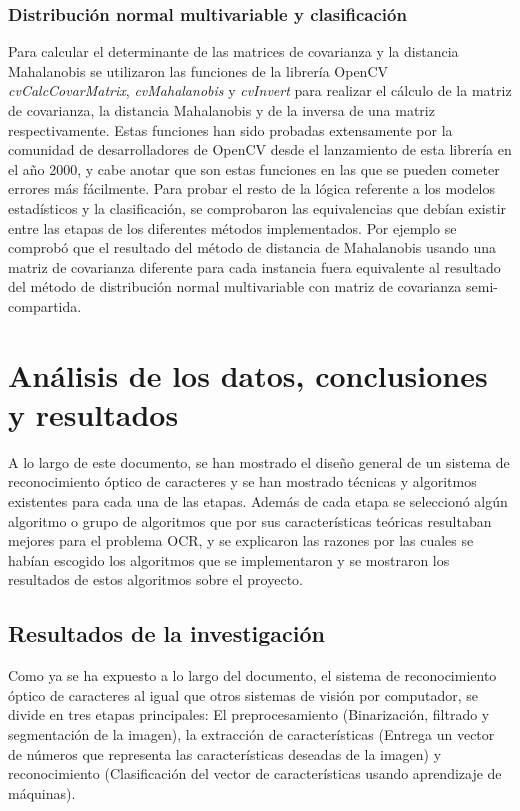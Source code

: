 \documentclass[a4paper, 11pt, oneside]{report}
\begin{document}
\subsection{Distribución normal multivariable y clasificación}
Para calcular el determinante de las matrices de covarianza y la distancia Mahalanobis se utilizaron las funciones de la librería OpenCV {\it cvCalcCovarMatrix}, {\it cvMahalanobis} y {\it cvInvert} para realizar el cálculo de la matriz de covarianza, la distancia Mahalanobis y de la inversa de una matriz respectivamente. Estas funciones han sido probadas extensamente por la comunidad de desarrolladores de OpenCV desde el lanzamiento de esta librería en el año 2000, y cabe anotar que son estas funciones en las que se pueden cometer errores más fácilmente.
Para probar el resto de la lógica referente a los modelos estadísticos y la clasificación, se comprobaron las equivalencias que debían existir entre las etapas de los diferentes métodos implementados. Por ejemplo se comprobó que el resultado del método de distancia de Mahalanobis usando una matriz de covarianza diferente para cada instancia fuera equivalente al resultado del método de distribución normal multivariable con matriz de covarianza semi-compartida.
\chapter{Análisis de los datos, conclusiones y resultados}
\label{chap:results}
A lo largo de este documento, se han mostrado el diseño general de un sistema de reconocimiento óptico de caracteres y se han mostrado técnicas y algoritmos existentes para cada una de las etapas. Además de cada etapa se seleccionó algún algoritmo o grupo de algoritmos que por sus características teóricas resultaban mejores para el problema OCR, y se explicaron las razones por las cuales se habían escogido los algoritmos que se implementaron y se mostraron los resultados de estos algoritmos sobre el proyecto.
\section{Resultados de la investigación}
Como ya se ha expuesto a lo largo del documento, el sistema de reconocimiento óptico de caracteres al igual que otros sistemas de visión por computador, se divide en tres etapas principales: El preprocesamiento (Binarización, filtrado y segmentación de la imagen), la extracción de características (Entrega un vector de números que representa las características deseadas de la imagen) y reconocimiento (Clasificación del vector de características usando aprendizaje de máquinas).
\end{document}
